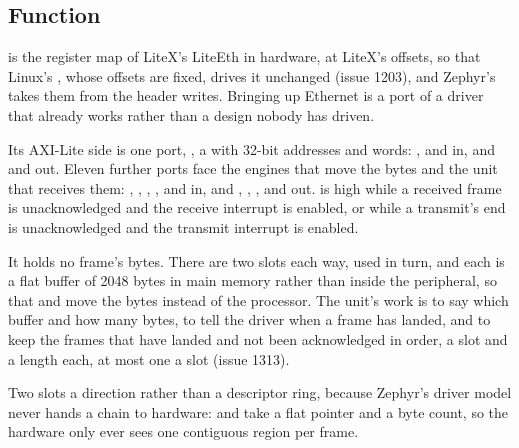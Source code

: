
%
{}{}

\subsection*{Function}

 is the register map of LiteX's LiteEth in hardware,
at LiteX's offsets, so that Linux's , whose
offsets are fixed, drives it unchanged (issue 1203), and Zephyr's
 takes them from the
header  writes. Bringing up Ethernet is a port of
a driver that already works rather than a design nobody has driven.

Its AXI-Lite side is one port, , a  with
32-bit addresses and words: ,  and
 in, and  and  out. Eleven
further ports face the engines that move the bytes and the unit that
receives them: , , ,
,  and  in, and
,
, ,  and
 out.  is high while a received frame is
unacknowledged and the receive interrupt is enabled, or while a
transmit's end is unacknowledged and the transmit interrupt is
enabled.

It holds no frame's bytes. There are two slots each way, used in turn,
and each is a flat buffer of 2048 bytes in main memory rather than
inside the peripheral, so that  and 
move the bytes instead of the processor. The unit's work is to say
which buffer and how many bytes, to tell the driver when a frame has
landed, and to keep the frames that have landed and not been
acknowledged in order, a slot and a length each, at most one a slot
(issue 1313).

Two slots a direction rather than a descriptor ring, because Zephyr's
driver model never hands a chain to hardware:
 and  take a flat pointer and a byte count, so the hardware only
ever sees one contiguous region per frame.

